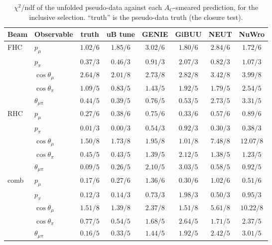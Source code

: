 \documentclass[11pt,a4paper]{article}
\begin{document}
\begin{table}[H]
  \centering
  \caption{$\chi^2$/ndf of the unfolded pseudo-data against each $A_C$-smeared prediction,
    for the inclusive selection. ``truth'' is the pseudo-data truth (the closure test).}
  \label{tab:chi2_incl}
  \small
  \begin{tabular}{llcccccc}
\toprule
Beam & Observable & truth & uB tune & GENIE & GiBUU & NEUT & NuWro \\
\midrule
    FHC  & $p_\mu$                & $1.02/6$ & $1.85/6$ & $3.02/6$ & $1.80/6$ & $2.84/6$ & $1.72/6$ \\
         & $p_\pi$                & $0.37/3$ & $0.46/3$ & $0.91/3$ & $2.07/3$ & $0.82/3$ & $1.07/3$ \\
         & $\cos\theta_\mu$       & $2.64/8$ & $2.01/8$ & $2.73/8$ & $2.82/8$ & $3.42/8$ & $3.99/8$ \\
         & $\cos\theta_\pi$       & $1.09/5$ & $0.83/5$ & $1.43/5$ & $1.92/5$ & $1.79/5$ & $2.54/5$ \\
         & $\theta_{\mu\pi}$      & $0.44/5$ & $0.39/5$ & $0.76/5$ & $0.53/5$ & $2.73/5$ & $3.31/5$ \\
    \midrule
    RHC  & $p_\mu$                & $0.27/6$ & $0.38/6$ & $0.75/6$ & $0.33/6$ & $0.57/6$ & $0.89/6$ \\
         & $p_\pi$                & $0.01/3$ & $0.00/3$ & $0.54/3$ & $0.92/3$ & $0.30/3$ & $0.38/3$ \\
         & $\cos\theta_\mu$       & $1.50/8$ & $1.73/8$ & $1.95/8$ & $1.01/8$ & $7.48/8$ & $12.07/8$ \\
         & $\cos\theta_\pi$       & $0.45/5$ & $0.43/5$ & $1.39/5$ & $2.12/5$ & $1.38/5$ & $1.23/5$ \\
         & $\theta_{\mu\pi}$      & $0.09/5$ & $0.26/5$ & $2.10/5$ & $3.03/5$ & $0.58/5$ & $0.92/5$ \\
    \midrule
    comb & $p_\mu$                & $0.17/6$ & $0.27/6$ & $1.36/6$ & $0.30/6$ & $1.02/6$ & $0.51/6$ \\
         & $p_\pi$                & $0.12/3$ & $0.14/3$ & $0.73/3$ & $1.98/3$ & $0.50/3$ & $0.95/3$ \\
         & $\cos\theta_\mu$       & $1.51/8$ & $1.39/8$ & $2.37/8$ & $1.51/8$ & $5.61/8$ & $10.22/8$ \\
         & $\cos\theta_\pi$       & $0.77/5$ & $0.54/5$ & $1.68/5$ & $2.64/5$ & $1.71/5$ & $2.37/5$ \\
         & $\theta_{\mu\pi}$      & $0.16/5$ & $0.33/5$ & $1.44/5$ & $1.92/5$ & $2.42/5$ & $3.01/5$ \\
\bottomrule
\end{tabular}
\end{table}
\end{document}
